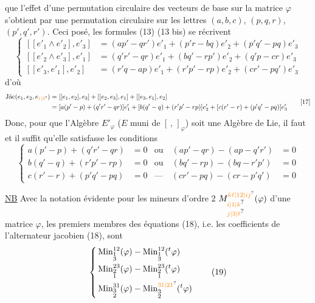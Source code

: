 que l'effet d'une permutation circulaire des vecteurs de base sur la matrice $\varphi$ s'obtient par une permutation circulaire sur les  lettres $(a,b,c)$, $(p,q,r)$, $(p',q',r')$. Ceci posé, les  formules (13) (13 bis) se récrivent
\[
\left\{\begin{aligned}
 [[e'_1\wedge e'_2],e'_3]&=(ap'-qr')e'_1+(p'r-bq)e'_2+(p'q'-pq)e'_3\\
 [[e'_2\wedge e'_3],e'_1]&=(q'r'-qr)e'_1+(bq'-rp')e'_2+(q'p-cr)e'_3\\
 [[e'_3,e'_1],e'_2]&=(r'q-ap)e'_1+(r'p'-rp)e'_2+(cr'-pq')e'_3
\end{aligned}\right. \tag*{(16)}
\]
d'où
\[
\begin{aligned}
 \text{Jác}(e_1,e_2,e_{\unsure{1|3}})&=[[e_1,e_2],e_3]+[[e_2,e_3],e_1]+[[e_3,e_1],e_2]\\
 &=[a(p'-p)+(q'r'-qr)]e'_1+[b(q'-q)+(r'p'-rp)]e'_2+[c(r'-r)+(p'q'-pq)]e'_3
\end{aligned}\tag*{[17]}
\]
Donc, pour que l'Algèbre $E'_\varphi$ ($E$ muni de $[\, ,\,]_\varphi$) soit une Algèbre de Lie, il faut et il suffit qu'elle satisfasse les conditions
\[
\left\{\begin{aligned}
 a(p'-p)+(q'r'-qr)&=0 &\text{ou}\quad (ap'-qr)-(ap-q'r')&=0\\
 b(q'-q)+(r'p'-rp)&=0 &\text{ou}\quad (bq'-rp)-(bq-r'p')&=0\\
 c(r'-r)+(p'q'-pq)&=0 &\text{---}\quad(cr'-pq)-(cr-p'q')&=0
\end{aligned}\right. \tag*{(18)}
\]

\uline{NB} Avec la notation évidente pour les mineurs d'ordre 2 $M_{\substack{\unsure{i|1|k}\\\unsure{j|3|\ell}}}^{\unsure{k\ell|12|ij}}(\varphi)$ d'une matrice $\varphi$, les premiers membres des équations (18), i.e. les coefficients de l'alternateur jacobien (18), sont
\[
\left\{\begin{aligned}
 &\operatorname{Min}_{\substack{1\\3}}^{12}(\varphi)-\operatorname{Min}_{\substack{1\\3}}^{12}({}^{t}\varphi)\\
 &\operatorname{Min}_{\substack{2\\1}}^{23}(\varphi)-\operatorname{Min}_{\substack{2\\1}}^{23}({}^{t}\varphi)\\
 &\operatorname{Min}_{\substack{3\\2}}^{31}(\varphi)-\operatorname{Min}_{\substack{3\\2}}^{\unsure{31|21}}({}^{t}\varphi)
\end{aligned}\right. \tag*{(19)}
\]

